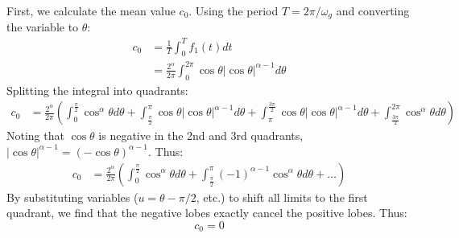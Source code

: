 \documentclass[10pt,twoside]{report}
\begin{document}
First, we calculate the mean value $c_0$. Using the period $T = 2\pi/\omega_g$ and converting the variable to $\theta$:
\begin{align*}
    c_0 &= \frac{1}{T}\int_{0}^{T} f_1(t) dt \\
        &= \frac{2^\alpha}{2\pi} \int_{0}^{2\pi} \cos\theta |\cos\theta|^{\alpha-1} d\theta
\end{align*}
Splitting the integral into quadrants:
\begin{align*}
    c_0 &= \frac{2^\alpha}{2\pi} \left( \int_{0}^{\frac{\pi}{2}} \cos^\alpha\theta d\theta + \int_{\frac{\pi}{2}}^{\pi} \cos\theta |\cos\theta|^{\alpha-1} d\theta + \int_{\pi}^{\frac{3\pi}{2}} \cos\theta |\cos\theta|^{\alpha-1} d\theta + \int_{\frac{3\pi}{2}}^{2\pi} \cos^\alpha\theta d\theta \right)
\end{align*}
Noting that $\cos\theta$ is negative in the 2nd and 3rd quadrants, $|\cos\theta|^{\alpha-1} = (-\cos\theta)^{\alpha-1}$. Thus:
\begin{align*}
    c_0 &= \frac{2^\alpha}{2\pi} \left( \int_{0}^{\frac{\pi}{2}} \cos^\alpha\theta d\theta + \int_{\frac{\pi}{2}}^{\pi} (-1)^{\alpha-1} \cos^\alpha\theta d\theta + \dots \right)
\end{align*}
By substituting variables ($u = \theta - \pi/2$, etc.) to shift all limits to the first quadrant, we find that the negative lobes exactly cancel the positive lobes. Thus:
\begin{equation}
    c_0 = 0
\end{equation}
\end{document}
